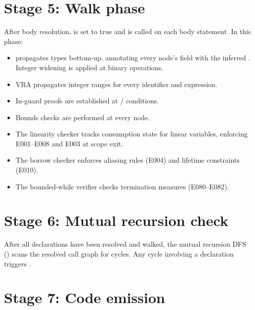 \section{Stage 5: Walk phase}
\label{sec:df-walk}

\pnum
After body resolution,  is set to true and
 is called on each body statement.  In this phase:

\begin{itemize}
\item {} propagates types bottom-up, annotating every
   node's  field with the inferred .
  Integer widening is applied at binary operations.
\item VRA propagates integer ranges for every identifier and expression.
\item In-guard proofs are established at  /  conditions.
\item Bounds checks are performed at every  node.
\item The linearity checker tracks consumption state for linear variables,
  enforcing E001–E008 and E003 at scope exit.
\item The borrow checker enforces aliasing rules (E004) and lifetime
  constraints (E010).
\item The bounded-while verifier checks termination measures (E080–E082).
\end{itemize}

\section{Stage 6: Mutual recursion check}
\label{sec:df-mrec}

\pnum
After all declarations have been resolved and walked, the mutual recursion
DFS () scans the resolved call graph for cycles.  Any
cycle involving a  declaration triggers .

\section{Stage 7: Code emission}
\label{sec:df-emit}

